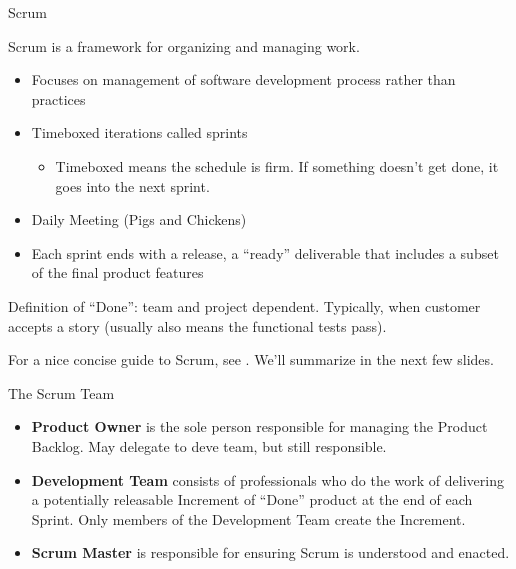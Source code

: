\documentclass{beamer}
\begin{document}
\begin{frame}[fragile]{Scrum}


Scrum is a framework for organizing and managing work.
\begin{itemize}
\item Focuses on management of software development process rather than practices
\item Timeboxed iterations called sprints
\begin{itemize}
\item Timeboxed means the schedule is firm.  If something doesn't get done, it goes into the next sprint.
\end{itemize}
\item Daily Meeting (Pigs and Chickens)
\item Each sprint ends with a release, a ``ready'' deliverable that includes a subset of the final product features
\end{itemize}
Definition of ``Done'': team and project dependent.  Typically, when customer accepts a story (usually also means the functional tests pass).

For a nice concise guide to Scrum, see .  We'll summarize in the next few slides.

\end{frame}

\begin{frame}[fragile]{The Scrum Team}


\begin{itemize}
\item {\bf Product Owner} is the sole person responsible for managing the Product Backlog.  May delegate to deve team, but still responsible.
\item {\bf Development Team} consists of professionals who do the work of delivering a potentially releasable Increment of ``Done'' product at the end of each Sprint. Only members of the Development Team create the Increment.
\item {\bf Scrum Master} is responsible for ensuring Scrum is understood and enacted.
\end{itemize}


\end{frame}
\end{document}

